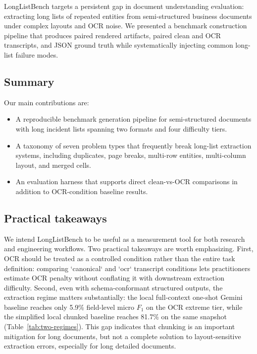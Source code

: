 LongListBench targets a persistent gap in document understanding evaluation: extracting long lists of repeated entities from semi-structured business documents under complex layouts and OCR noise. We presented a benchmark construction pipeline that produces paired rendered artifacts, paired clean and OCR transcripts, and JSON ground truth while systematically injecting common long-list failure modes.

\subsection{Summary}
Our main contributions are:
\begin{itemize}
    \item A reproducible benchmark generation pipeline for semi-structured documents with long incident lists spanning two formats and four difficulty tiers.
    \item A taxonomy of seven problem types that frequently break long-list extraction systems, including duplicates, page breaks, multi-row entities, multi-column layout, and merged cells.
    \item An evaluation harness that supports direct clean-vs-OCR comparisons in addition to OCR-condition baseline results.
\end{itemize}

\subsection{Practical takeaways}
We intend LongListBench to be useful as a measurement tool for both research and engineering workflows. Two practical takeaways are worth emphasizing. First, OCR should be treated as a controlled condition rather than the entire task definition: comparing `canonical` and `ocr` transcript conditions lets practitioners estimate OCR penalty without conflating it with downstream extraction difficulty. Second, even with schema-conformant structured outputs, the extraction regime matters substantially: the local full-context one-shot Gemini baseline reaches only 5.9\% field-level micro $F_1$ on the OCR extreme tier, while the simplified local chunked baseline reaches 81.7\% on the same snapshot (Table~\ref{tab:two-regimes}). This gap indicates that chunking is an important mitigation for long documents, but not a complete solution to layout-sensitive extraction errors, especially for long detailed documents.

